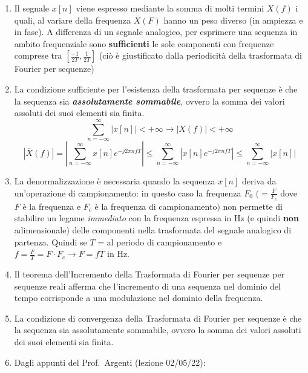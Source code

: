 \documentclass[
]{article}
\begin{document}
\begin{enumerate}
\def\labelenumi{\arabic{enumi}.}
\setcounter{enumi}{5}
\item
  Il segnale \(x[n]\) viene espresso mediante la somma di molti termini
  \(X(f)\) i quali, al variare della frequenza \(\overline{X}(F)\) hanno
  un peso diverso (in ampiezza e in fase). A differenza di un segnale
  analogico, per esprimere una sequenza in ambito frequenziale sono
  \textbf{sufficienti} le sole componenti con frequenze comprese tra
  \([\frac{-1}{2T}, \frac{1}{2T}]\) (ciò è giustificato dalla
  periodicità della trasformata di Fourier per sequenze)
\item
  La condizione sufficiente per l'esistenza della trasformata per
  sequenze è che la sequenza sia \textbf{\emph{assolutamente
  sommabile}}, ovvero la somma dei valori assoluti dei suoi elementi sia
  finita.
  \[\displaystyle \sum_{n=-\infty}^{\infty} |x[n]| < + \infty \to |X(f)| < +\infty\]
  \[|\overline{X}(f)| = |\sum_{n=-\infty}^{\infty} x[n] e^{-j2\pi nfT}| \leq \sum_{n=-\infty}^{\infty} | x[n] e^{-j2\pi nfT}| \leq 
    \sum_{n=-\infty}^{\infty} |x[n]|\]
\item
  La denormalizzazione è necessaria quando la sequenza \(x[n]\) deriva
  da un'operazione di campionamento: in questo caso la frequenza \(F_0\)
  \((= \frac{F}{F_c}\) dove \(F\) è la frequenza e \(F_c\) è la
  frequenza di campionamento\()\) non permette di stabilire un legame
  \emph{immediato} con la frequenza espressa in Hz (e quindi
  \textbf{non} adimensionale) delle componenti nella trasformata del
  segnale analogico di partenza. Quindi se \(T\) = al periodo di
  campionamento e \(f=\frac{F}{T}=F\cdot F_c \to F=fT\) in Hz.
\item
  Il teorema dell'Incremento della Trasformata di Fourier per sequenze
  per sequenze reali afferma che l'incremento di una sequenza nel
  dominio del tempo corrisponde a una modulazione nel dominio della
  frequenza.
\item
  La condizione di convergenza della Trasformata di Fourier per sequenze
  è che la sequenza sia assolutamente sommabile, ovvero la somma dei
  valori assoluti dei suoi elementi sia finita.
\item
  Dagli appunti del Prof.~Argenti (lezione 02/05/22):


\end{enumerate}
\end{document}
